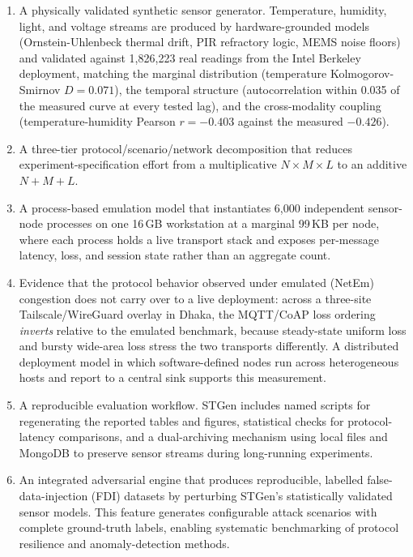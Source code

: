 \documentclass[jsan,article,submit,moreauthors,pdftex]{Definitions/mdpi}
\begin{document}
\begin{enumerate}
    \item A physically validated synthetic sensor generator. Temperature, humidity, light, and voltage streams are produced by hardware-grounded models (Ornstein-Uhlenbeck thermal drift, PIR refractory logic, MEMS noise floors) and validated against 1,826,223 real readings from the Intel Berkeley deployment, matching the marginal distribution (temperature Kolmogorov-Smirnov $D=0.071$), the temporal structure (autocorrelation within 0.035 of the measured curve at every tested lag), and the cross-modality coupling (temperature-humidity Pearson $r=-0.403$ against the measured $-0.426$).
    \item A three-tier protocol/scenario/network decomposition that reduces experiment-specification effort from a multiplicative $N \times M \times L$ to an additive $N+M+L$.
    \item A process-based emulation model that instantiates 6{,}000 independent sensor-node processes on one 16\,GB workstation at a marginal 99\,KB per node, where each process holds a live transport stack and exposes per-message latency, loss, and session state rather than an aggregate count.
    \item Evidence that the protocol behavior observed under emulated (NetEm) congestion does not carry over to a live deployment: across a three-site Tailscale/WireGuard overlay in Dhaka, the MQTT/CoAP loss ordering \emph{inverts} relative to the emulated benchmark, because steady-state uniform loss and bursty wide-area loss stress the two transports differently. A distributed deployment model in which software-defined nodes run across heterogeneous hosts and report to a central sink supports this measurement.
    \item A reproducible evaluation workflow. STGen includes named scripts for regenerating the reported tables and figures, statistical checks for protocol-latency comparisons, and a dual-archiving mechanism using local files and MongoDB to preserve sensor streams during long-running experiments.
    \item An integrated adversarial engine that produces reproducible, labelled false-data-injection (FDI) datasets by perturbing STGen's statistically validated sensor models. This feature generates configurable attack scenarios with complete ground-truth labels, enabling systematic benchmarking of protocol resilience and anomaly-detection methods.
   

\end{enumerate}
\end{document}
